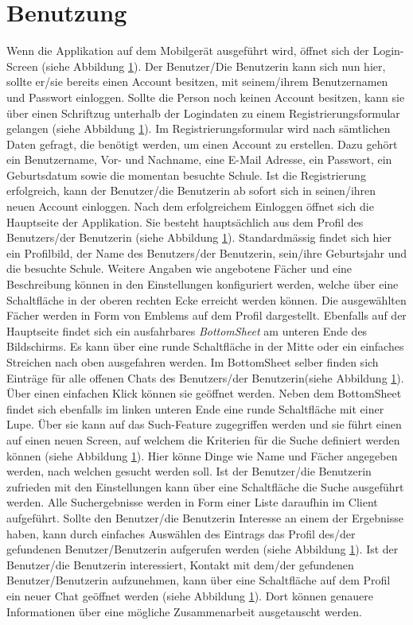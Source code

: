 \documentclass[a4paper,11pt]{report}
\begin{document}
	\section{Benutzung}%
	Wenn die Applikation auf dem Mobilgerät ausgeführt wird, öffnet sich der Login-Screen (siehe Abbildung \ref{}). Der Benutzer/Die Benutzerin kann sich nun hier, sollte er/sie bereits einen Account besitzen, mit seinem/ihrem Benutzernamen und Passwort einloggen. Sollte die Person noch keinen Account besitzen, kann sie über einen Schriftzug unterhalb der Logindaten zu einem Registrierungsformular gelangen (siehe Abbildung \ref{}). Im Registrierungsformular wird nach sämtlichen Daten gefragt, die benötigt werden, um einen Account zu erstellen. Dazu gehört ein Benutzername, Vor- und Nachname, eine E-Mail Adresse, ein Passwort, ein Geburtsdatum sowie die momentan besuchte Schule. Ist die Registrierung erfolgreich, kann der Benutzer/die Benutzerin ab sofort sich in seinen/ihren neuen Account einloggen. Nach dem erfolgreichem Einloggen öffnet sich die Hauptseite der Applikation. Sie besteht hauptsächlich aus dem Profil des Benutzers/der Benutzerin (siehe Abbildung \ref{}). Standardmässig findet sich hier ein Profilbild, der Name des Benutzers/der Benutzerin, sein/ihre Geburtsjahr und die besuchte Schule. Weitere Angaben wie angebotene Fächer und eine Beschreibung können in den Einstellungen konfiguriert werden, welche über eine Schaltfläche in der oberen rechten Ecke erreicht werden können. Die ausgewählten Fächer werden in Form von Emblems auf dem Profil dargestellt. Ebenfalls auf der Hauptseite findet sich ein ausfahrbares \emph{BottomSheet} am unteren Ende des Bildschirms. Es kann über eine runde Schaltfläche in der Mitte oder ein einfaches Streichen nach oben ausgefahren werden. Im BottomSheet selber finden sich Einträge für alle offenen Chats des Benutzers/der Benutzerin(siehe Abbildung \ref{}). Über einen einfachen Klick können sie geöffnet werden. Neben dem BottomSheet findet sich ebenfalls im linken unteren Ende eine runde Schaltfläche mit einer Lupe. Über sie kann auf das Such-Feature zugegriffen werden und sie führt einen auf einen neuen Screen, auf welchem die Kriterien für die Suche definiert werden können (siehe Abbildung \ref{}). Hier könne Dinge wie Name und Fächer angegeben werden, nach welchen gesucht werden soll. Ist der Benutzer/die Benutzerin zufrieden mit den Einstellungen kann über eine Schaltfläche die Suche ausgeführt werden. Alle Suchergebnisse werden in Form einer Liste daraufhin im Client aufgeführt. Sollte den Benutzer/die Benutzerin Interesse an einem der Ergebnisse haben, kann durch einfaches Auswählen des Eintrags das Profil des/der gefundenen Benutzer/Benutzerin aufgerufen werden (siehe Abbildung \ref{}). Ist der Benutzer/die Benutzerin interessiert, Kontakt mit dem/der gefundenen Benutzer/Benutzerin aufzunehmen, kann über eine Schaltfläche auf dem Profil ein neuer Chat geöffnet werden (siehe Abbildung \ref{}). Dort können genauere Informationen über eine mögliche Zusammenarbeit ausgetauscht werden.
	
\end{document}
